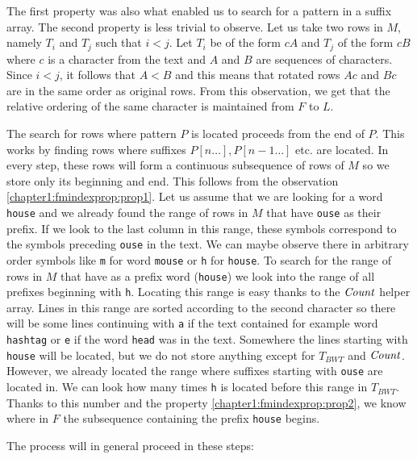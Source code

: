 The first property was also what enabled us to search for a pattern in a suffix array. The second
property is less trivial to observe. Let us take two rows in $M$, namely $T_i$ and $T_j$
such that $i<j$. Let $T_i$ be of the form $cA$ and $T_j$ of the form $cB$ where $c$ is a
character from the text and $A$ and $B$ are sequences of characters. Since $i<j$, it follows that
$A<B$ and this means that rotated rows $Ac$ and $Bc$ are in the same order as original rows.
From this observation, we get that the relative ordering of the same character is maintained
from $F$ to $L$.

The search for rows where pattern $P$ is located proceeds from the end of $P$. This works by
finding rows where suffixes $P[n\ldots], P[n-1\ldots]$ etc. are located. In every step, these
rows will form a continuous subsequence of rows of $M$ so we store only its beginning and end.
This follows from the observation \ref{chapter1:fmindexprop:prop1}. Let us assume that we are
looking for a word {\tt house} and we already found the range of rows in $M$ that have {\tt ouse}
as their prefix. If we look to the last column in this range, these symbols correspond to the symbols
preceding {\tt ouse} in the text. We can maybe observe there in arbitrary order symbols like {\tt m}
for word {\tt mouse} or {\tt h} for {\tt house}. To search for the range of rows in $M$ that have as a prefix
word ({\tt house}) we look into the range of all prefixes beginning with {\tt h}. Locating this
range is easy thanks to the $\mathit{Count}$ helper array. Lines in this range are sorted according to the
second character so there will be some lines continuing with {\tt a} if the text contained for example
word {\tt hashtag} or {\tt e} if the word {\tt head} was in the text. Somewhere the lines starting with 
{\tt house} will be located, but we do not store anything except for $T_{BWT}$ and $\mathit{Count}$.
However, we already located the range where suffixes starting with {\tt ouse} are located in.
We can look how many times {\tt h} is located before this range in $T_{BWT}$. Thanks to this
number and the property \ref{chapter1:fmindexprop:prop2}, we know where in $F$ the subsequence
containing the prefix {\tt house} begins.


The process will in general proceed in these steps:

